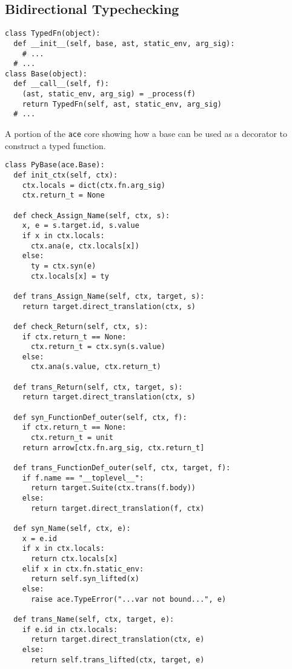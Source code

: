 \documentclass[10pt,preprint]{sigplanconf}
\begin{document}
{\subsection{Bidirectional Typechecking}
\begin{codelisting}
\begin{lstlisting}
class TypedFn(object):
  def __init__(self, base, ast, static_env, arg_sig):
    # ...
  # ...
class Base(object):
  def __call__(self, f):
    (ast, static_env, arg_sig) = _process(f)
    return TypedFn(self, ast, static_env, arg_sig)
  # ...
\end{lstlisting}
\caption{A portion of the \texttt{ace} core showing how a base can be used as a decorator to construct a typed function.}
\label{base}
\end{codelisting}

\begin{codelisting}
\begin{lstlisting}
class PyBase(ace.Base):
  def init_ctx(self, ctx):
    ctx.locals = dict(ctx.fn.arg_sig)
    ctx.return_t = None

  def check_Assign_Name(self, ctx, s):
    x, e = s.target.id, s.value
    if x in ctx.locals:
      ctx.ana(e, ctx.locals[x])
    else:
      ty = ctx.syn(e)
      ctx.locals[x] = ty
	  
  def trans_Assign_Name(self, ctx, target, s):
    return target.direct_translation(ctx, s)
              
  def check_Return(self, ctx, s):
    if ctx.return_t == None:
      ctx.return_t = ctx.syn(s.value)
    else:
      ctx.ana(s.value, ctx.return_t)
      
  def trans_Return(self, ctx, target, s):
    return target.direct_translation(ctx, s)
          
  def syn_FunctionDef_outer(self, ctx, f):
    if ctx.return_t == None:
      ctx.return_t = unit
    return arrow[ctx.fn.arg_sig, ctx.return_t]
    
  def trans_FunctionDef_outer(self, ctx, target, f):
    if f.name == "__toplevel__":
      return target.Suite(ctx.trans(f.body))
    else:
      return target.direct_translation(f, ctx)

  def syn_Name(self, ctx, e):
    x = e.id
    if x in ctx.locals:
      return ctx.locals[x]
    elif x in ctx.fn.static_env:
      return self.syn_lifted(x)
    else:
      raise ace.TypeError("...var not bound...", e)
      
  def trans_Name(self, ctx, target, e):
    if e.id in ctx.locals:
      return target.direct_translation(ctx, e)
    else:
      return self.trans_lifted(ctx, target, e)
  

\end{lstlisting}
\end{codelisting}}
\end{document}
